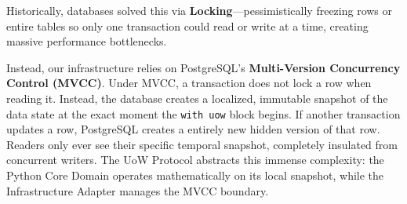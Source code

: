 Historically, databases solved this via \textbf{Locking}---pessimistically freezing rows or entire tables so only one transaction could read or write at a time, creating massive performance bottlenecks.

Instead, our infrastructure relies on PostgreSQL's \textbf{Multi-Version Concurrency Control (MVCC)}. Under MVCC, a transaction does not lock a row when reading it. Instead, the database creates a localized, immutable snapshot of the data state at the exact moment the \texttt{with uow} block begins. If another transaction updates a row, PostgreSQL creates a entirely new hidden version of that row. Readers only ever see their specific temporal snapshot, completely insulated from concurrent writers. The UoW Protocol abstracts this immense complexity: the Python Core Domain operates mathematically on its local snapshot, while the Infrastructure Adapter manages the MVCC boundary.
